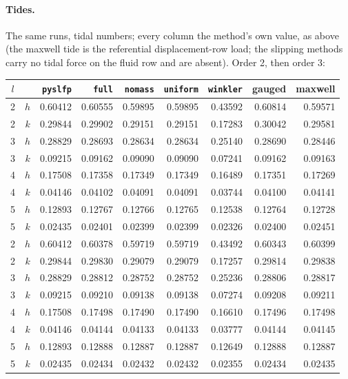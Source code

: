 \documentclass[11pt]{article}
\numberwithin{equation}{section}
\newcommand{\code}[1]{\texttt{#1}}
\begin{document}
\paragraph{Tides.} The same runs, tidal numbers; every column the
method's own value, as above (the maxwell tide is the referential
displacement-row load; the slipping methods carry no tidal force on
the fluid row and are absent). Order 2, then order 3:
\begin{center}
\small
\begin{tabular}{@{}cc rrrrrrr@{}}
\toprule
$l$ & & \code{pyslfp} & \code{full} & \code{nomass} & \code{uniform} & \code{winkler} & gauged & maxwell \\
\midrule
2 & $h$ & 0.60412 & 0.60555 & 0.59895 & 0.59895 & 0.43592 & 0.60814 & 0.59571 \\
2 & $k$ & 0.29844 & 0.29902 & 0.29151 & 0.29151 & 0.17283 & 0.30042 & 0.29581 \\
3 & $h$ & 0.28829 & 0.28693 & 0.28634 & 0.28634 & 0.25140 & 0.28690 & 0.28446 \\
3 & $k$ & 0.09215 & 0.09162 & 0.09090 & 0.09090 & 0.07241 & 0.09162 & 0.09163 \\
4 & $h$ & 0.17508 & 0.17358 & 0.17349 & 0.17349 & 0.16489 & 0.17351 & 0.17269 \\
4 & $k$ & 0.04146 & 0.04102 & 0.04091 & 0.04091 & 0.03744 & 0.04100 & 0.04141 \\
5 & $h$ & 0.12893 & 0.12767 & 0.12766 & 0.12765 & 0.12538 & 0.12764 & 0.12728 \\
5 & $k$ & 0.02435 & 0.02401 & 0.02399 & 0.02399 & 0.02326 & 0.02400 & 0.02451 \\
\midrule
2 & $h$ & 0.60412 & 0.60378 & 0.59719 & 0.59719 & 0.43492 & 0.60343 & 0.60399 \\
2 & $k$ & 0.29844 & 0.29830 & 0.29079 & 0.29079 & 0.17257 & 0.29814 & 0.29838 \\
3 & $h$ & 0.28829 & 0.28812 & 0.28752 & 0.28752 & 0.25236 & 0.28806 & 0.28817 \\
3 & $k$ & 0.09215 & 0.09210 & 0.09138 & 0.09138 & 0.07274 & 0.09208 & 0.09211 \\
4 & $h$ & 0.17508 & 0.17498 & 0.17490 & 0.17490 & 0.16610 & 0.17496 & 0.17498 \\
4 & $k$ & 0.04146 & 0.04144 & 0.04133 & 0.04133 & 0.03777 & 0.04144 & 0.04145 \\
5 & $h$ & 0.12893 & 0.12888 & 0.12887 & 0.12887 & 0.12649 & 0.12888 & 0.12887 \\
5 & $k$ & 0.02435 & 0.02434 & 0.02432 & 0.02432 & 0.02355 & 0.02434 & 0.02435 \\
\bottomrule
\end{tabular}
\end{center}
\end{document}
